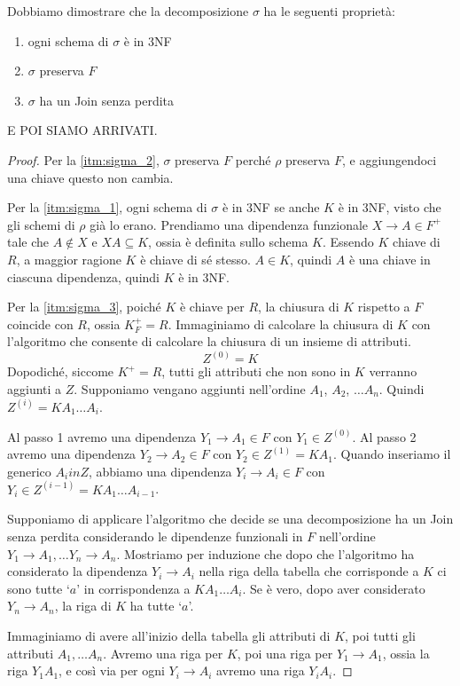 Dobbiamo dimostrare che la decomposizione $\sigma$ ha le seguenti propriet\`a:
\begin{enumerate}
    \item\label{itm:sigma_1} ogni schema di $\sigma$ \`e in 3NF
    \item\label{itm:sigma_2} $\sigma$ preserva $F$
    \item\label{itm:sigma_3} $\sigma$ ha un Join senza perdita
\end{enumerate}
E POI SIAMO ARRIVATI.

\begin{proof}
Per la \ref{itm:sigma_2}, $\sigma$ preserva $F$ perch\'e $\rho$ preserva $F$, e aggiungendoci una chiave questo non cambia.

Per la \ref{itm:sigma_1}, ogni schema di $\sigma$ \`e in 3NF se anche $K$ \`e in 3NF, visto che gli schemi di $\rho$ gi\`a lo erano. Prendiamo una dipendenza funzionale $X \to A \in F^+$ tale che $A \notin X$ e $XA \subseteq K$, ossia \`e definita sullo schema $K$. Essendo $K$ chiave di $R$, a maggior ragione $K$ \`e chiave di s\'e stesso. $A \in K$, quindi $A$ \`e una chiave in ciascuna dipendenza, quindi $K$ \`e in 3NF.

Per la \ref{itm:sigma_3}, poich\'e $K$ \`e chiave per $R$, la chiusura di $K$ rispetto a $F$ coincide con $R$, ossia $K^+_F = R$. Immaginiamo di calcolare la chiusura di $K$ con l'algoritmo che consente di calcolare la chiusura di un insieme di attributi.
\[
Z^{(0)} = K
\]
Dopodich\'e, siccome $K^+ = R$, tutti gli attributi che non sono in $K$ verranno aggiunti a $Z$. Supponiamo vengano aggiunti nell'ordine $A_1$, $A_2$, $\dots A_n$. Quindi $Z^{(i)} = K A_1 \dots A_i$.

Al passo 1 avremo una dipendenza $Y_1 \to A_1 \in F$ con $Y_1 \in Z^{(0)}$. Al passo 2 avremo una dipendenza $Y_2 \to A_2 \in F$ con $Y_2 \in Z^{(1)} = K A_1$. Quando inseriamo il generico $A_i in Z$, abbiamo una dipendenza $Y_i \to A_i \in F$ con $Y_i \in Z^{(i-1)} = K A_1 \dots A_{i-1}$.

Supponiamo di applicare l'algoritmo che decide se una decomposizione ha un Join senza perdita considerando le dipendenze funzionali in $F$ nell'ordine $Y_1 \to A_1, \dots Y_n \to A_n$. Mostriamo per induzione che dopo che l'algoritmo ha considerato la dipendenza $Y_i \to A_i$ nella riga della tabella che corrisponde a $K$ ci sono tutte `$a$' in corrispondenza a $K A_1 \dots A_i$. Se \`e vero, dopo aver considerato $Y_n \to A_n$, la riga di $K$ ha tutte `$a$'.

Immaginiamo di avere all'inizio della tabella gli attributi di $K$, poi tutti gli attributi $A_1, \dots A_n$. Avremo una riga per $K$, poi una riga per $Y_1 \to A_1$, ossia la riga $Y_1 A_1$, e cos\`i via per ogni $Y_i \to A_i$ avremo una riga $Y_i A_i$.


\end{proof}
